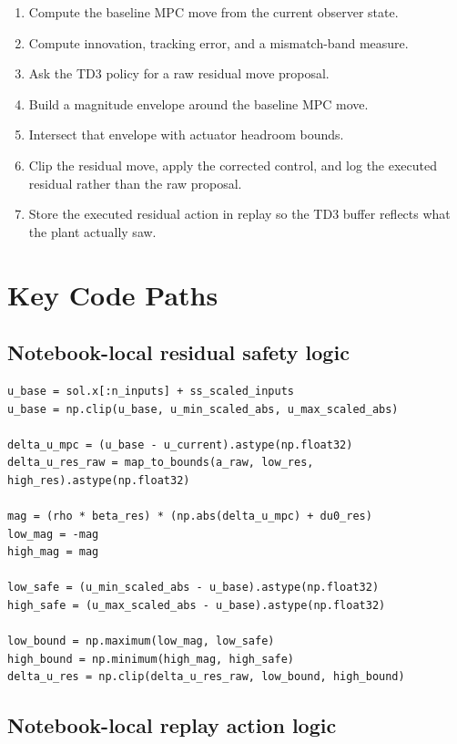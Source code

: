 \documentclass[11pt]{article}
\begin{document}
\begin{enumerate}
\item Compute the baseline MPC move from the current observer state.
\item Compute innovation, tracking error, and a mismatch-band measure.
\item Ask the TD3 policy for a raw residual move proposal.
\item Build a magnitude envelope around the baseline MPC move.
\item Intersect that envelope with actuator headroom bounds.
\item Clip the residual move, apply the corrected control, and log the executed
      residual rather than the raw proposal.
\item Store the executed residual action in replay so the TD3 buffer reflects
      what the plant actually saw.
\end{enumerate}

\section*{Key Code Paths}

\subsection*{Notebook-local residual safety logic}

\begin{lstlisting}
u_base = sol.x[:n_inputs] + ss_scaled_inputs
u_base = np.clip(u_base, u_min_scaled_abs, u_max_scaled_abs)

delta_u_mpc = (u_base - u_current).astype(np.float32)
delta_u_res_raw = map_to_bounds(a_raw, low_res, high_res).astype(np.float32)

mag = (rho * beta_res) * (np.abs(delta_u_mpc) + du0_res)
low_mag = -mag
high_mag = mag

low_safe = (u_min_scaled_abs - u_base).astype(np.float32)
high_safe = (u_max_scaled_abs - u_base).astype(np.float32)

low_bound = np.maximum(low_mag, low_safe)
high_bound = np.minimum(high_mag, high_safe)
delta_u_res = np.clip(delta_u_res_raw, low_bound, high_bound)
\end{lstlisting}

\subsection*{Notebook-local replay action logic}
\end{document}
